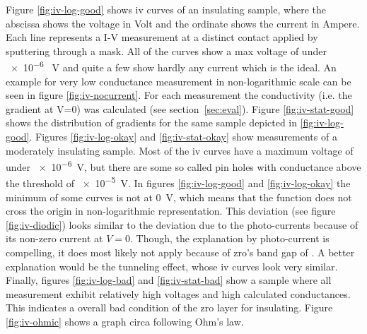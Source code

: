 Figure \ref{fig:iv-log-good} shows \gls{iv} curves of an insulating sample, where the abscissa shows the voltage in Volt and the ordinate shows the current in Ampere. 
Each line represents a I-V measurement at a distinct contact applied by sputtering through a mask. 
All of the curves show a max voltage of under \num{e-6} \SI{}{\volt} 
and quite a few show hardly any current which is the ideal. 
An example for very low conductance measurement in non-logarithmic scale can be seen in figure \ref{fig:iv-nocurrent}.
For each measurement the conductivity (i.e. the gradient at V=0) was calculated (see section~\ref{sec:eval}). 
Figure \ref{fig:iv-stat-good} shows the distribution of gradients for the same sample depicted in \ref{fig:iv-log-good}.
%
Figures \ref{fig:iv-log-okay} and \ref{fig:iv-stat-okay} show measurements of a moderately insulating sample. 
Most of the \gls{iv} curves have a maximum voltage of under \num{e-6}\SI{}{\volt}, 
but there are some so called pin holes with conductance above the threshold of \num{e-5}\SI{}{\volt}. %
%
In figures \ref{fig:iv-log-good} and \ref{fig:iv-log-okay} the minimum of some curves 
is not at \SI{0}{\volt}, which means that the function does not cross the origin in non-logarithmic representation. 
%
This deviation (see figure \ref{fig:iv-diodic}) looks similar to the deviation due to the photo-currents\cite{perez2018solar} because of its non-zero current at $V=0$.
Though, the explanation by photo-current is compelling, it does most likely not apply because of \gls{zro}'s band gap of \cite{sinhamahapatra2016oxygen}.
A better explanation would be the tunneling effect, whose \gls{iv} curves look very similar\cite{feenstra1994scanning,datta1997current}.
%
Finally, figures \ref{fig:iv-log-bad} and \ref{fig:iv-stat-bad} show a sample 
where all measurement exhibit relatively high voltages and high calculated conductances. 
This indicates a overall bad condition of the \gls{zro} layer for insulating. 
Figure \ref{fig:iv-ohmic} shows a graph circa following Ohm's law. 
%

